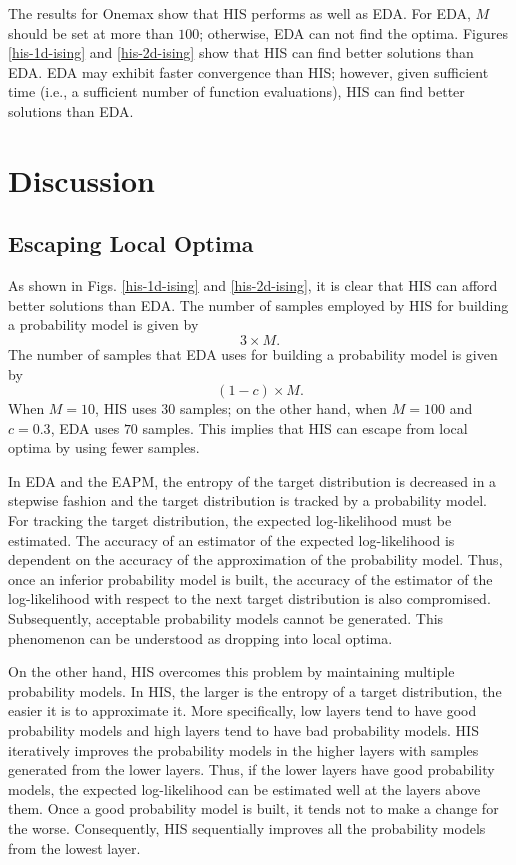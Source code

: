 The results for Onemax show that
HIS performs as well as EDA.
For EDA, $M$ should be set at more than $100$;
otherwise, EDA can not find the optima.
Figures \ref{his-1d-ising} and \ref{his-2d-ising}
show that HIS can find better solutions than EDA.
EDA may exhibit faster convergence than HIS;
however, given sufficient time 
(i.e., a sufficient number of function evaluations), 
HIS can find better solutions than EDA.


\section{Discussion}
\subsection{Escaping Local Optima}
As shown in Figs. \ref{his-1d-ising} and \ref{his-2d-ising},
it is clear that HIS can afford better solutions than EDA.
The number of samples employed by HIS for building a probability model
is given by
\begin{equation}
 3 \times M.
\end{equation}
The number of samples that EDA uses for building a probability model
is given by
\begin{equation}
 (1-c) \times M.
\end{equation}
When $M=10$, HIS uses $30$ samples; on the other hand,
when $M=100$ and $c=0.3$, EDA uses  $70$ samples.
This implies that HIS can escape from local optima
by using fewer samples.

In EDA and the EAPM,
the entropy of the target distribution
is decreased in a stepwise fashion and
the target distribution is tracked 
by a probability model.
For tracking the target distribution,
the expected log-likelihood must be estimated.
The accuracy of an estimator of the expected log-likelihood 
is dependent on the accuracy of the approximation of the probability model.
Thus, once an inferior probability model is built,
the accuracy of the estimator of the log-likelihood 
with respect to the next target distribution is also compromised.
Subsequently, 
acceptable probability models cannot be generated.  
This phenomenon can be understood as dropping into local optima.

On the other hand,
HIS overcomes this problem by maintaining 
multiple probability models.
In HIS, the larger is the entropy of a target distribution,
the easier it is to approximate it.
More specifically,
low layers tend to have good probability models
and high layers tend to have bad probability models.
HIS iteratively improves the probability models in the higher layers 
with samples generated from the lower layers.
Thus, if the lower layers have good probability models,
the expected log-likelihood can be
estimated well at the layers above them.
Once a good probability model is built,
it tends not to make a change for the worse.
Consequently,
HIS sequentially improves all the probability models 
from the lowest layer.
 
